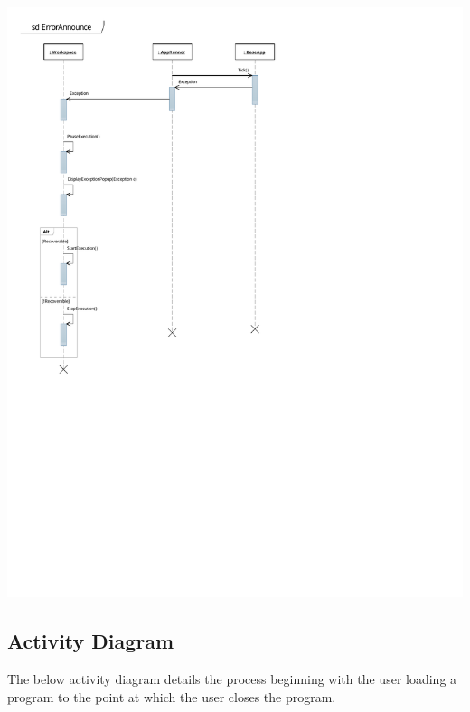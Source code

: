 \documentclass[12pt]{article}
\begin{document}
\begin{center}
        \includegraphics[scale=1]{./pdfs/MS5Models/ErrorAnnounce.pdf}
\end{center}

\clearpage

\subsection{Activity Diagram}

The below activity diagram details the process beginning with the user loading a program to the point at which the user closes the program.
\end{document}
